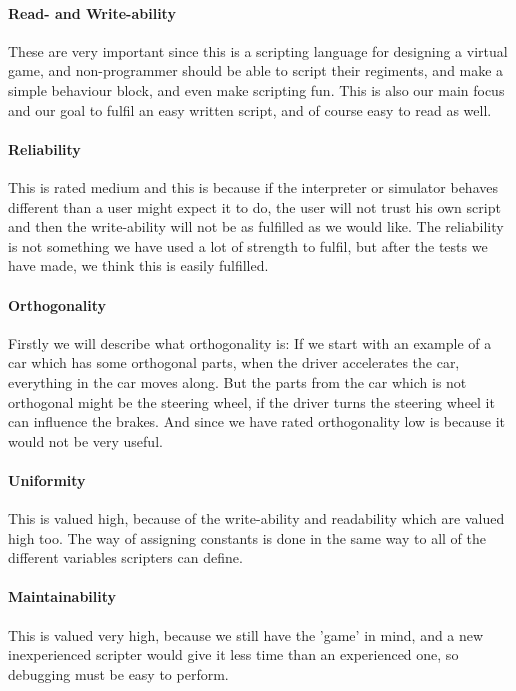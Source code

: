 \paragraph{Read- and Write-ability} These are very important since this is a scripting language for designing a virtual game, and non-programmer should be able to script their regiments, and make a simple behaviour block, and even make scripting fun. This is also our main focus and our goal to fulfil an easy written script, and of course easy to read as well.

\paragraph{Reliability} This is rated medium and this is because if the interpreter or simulator behaves different than a user might expect it to do, the user will not trust his own script and then the write-ability will not be as fulfilled as we would like. The reliability is not something we have used a lot of strength to fulfil, but after the tests we have made, we think this is easily fulfilled.

\paragraph{Orthogonality} Firstly we will describe what orthogonality is: If we start with an example of a car which has some orthogonal parts, when the driver accelerates the car, everything in the car moves along. But the parts from the car which is not orthogonal might be the steering wheel, if the driver turns the steering wheel it can influence the brakes. And since we have rated orthogonality low is because it would not be very useful.
 
\paragraph{Uniformity} This is valued high, because of the write-ability and readability which are valued high too. The way of assigning constants is done in the same way to all of the different variables scripters can define.


\paragraph{Maintainability} This is valued very high, because we still have the 'game' in mind, and a new inexperienced scripter would give it less time than an experienced one, so debugging must be easy to perform.

